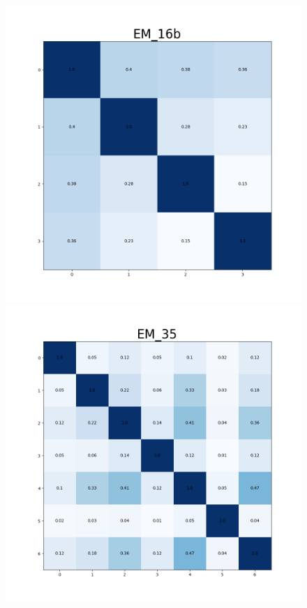 \begin{figure}[!h]
\begin{minipage}[t]{.5\textwidth}
\centering
\includegraphics[width=\textwidth]{figuras/hmEM16b.png} 
\end{minipage}%
\begin{minipage}[t]{.5\textwidth}
\centering
\includegraphics[width=\textwidth]{figuras/hmEM35.png}

\end{minipage}
\end{figure}
